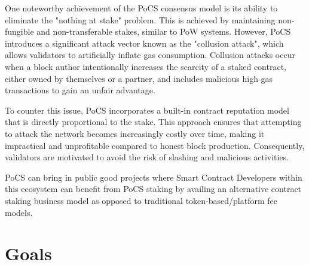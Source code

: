 \documentclass{article}
\begin{document}
One noteworthy achievement of the PoCS consensus model is its ability to eliminate the "nothing at stake" problem. This is achieved by maintaining non-fungible and non-transferable stakes, similar to PoW systems. However, PoCS introduces a significant attack vector known as the "collusion attack", which allows validators to artificially inflate gas consumption. Collusion attacks occur when a block author intentionally increases the scarcity of a staked contract, either owned by themselves or a partner, and includes malicious high gas transactions to gain an unfair advantage.

To counter this issue, PoCS incorporates a built-in contract reputation model that is directly proportional to the stake. This approach ensures that attempting to attack the network becomes increasingly costly over time, making it impractical and unprofitable compared to honest block production. Consequently, validators are motivated to avoid the risk of slashing and malicious activities.

PoCS can bring in public good projects where Smart Contract Developers within this ecosystem can benefit from PoCS staking by availing an alternative contract staking business model as opposed to traditional token-based/platform fee models.

\section{Goals}
\end{document}
